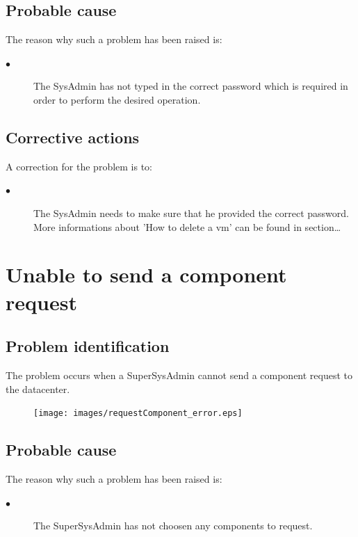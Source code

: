 \subsection{Probable cause}

The reason why such a problem has been raised is:\\
\begin{description}
\item[$\bullet$] The SysAdmin has not typed in the correct password which is
required in order to perform the desired operation.
\end{description}


\subsection{Corrective actions}

A correction for the problem is to:\\
\begin{description}
\item[$\bullet$] The SysAdmin needs to make sure that he provided the correct
password. More informations about 'How to delete a vm' can be found in
section\ldots

\end{description}






\section{Unable to send a component request}

\subsection{Problem identification}
The problem occurs when a SuperSysAdmin cannot send a component request to the
datacenter.

\begin{figure}[H]
\centering
\texttt{[image: images/requestComponent\_error.eps]}
\caption{\label{overflow}}
\end{figure}

\subsection{Probable cause}

The reason why such a problem has been raised is:\\
\begin{description}
\item[$\bullet$] The SuperSysAdmin has not choosen any components to request.
\end{description}


